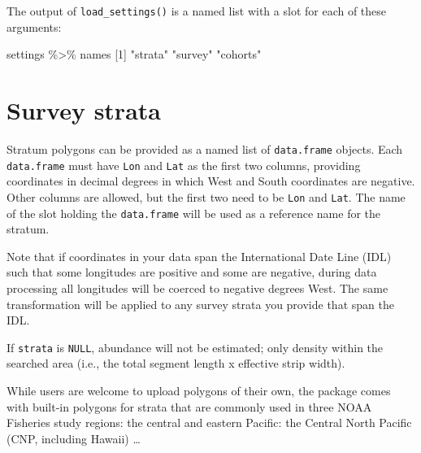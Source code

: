 \documentclass[
]{book}
\newenvironment{Shaded}{\begin{snugshade}}{\end{snugshade}}
\newcommand{\DecValTok}[1]{\textcolor[rgb]{0.00,0.00,0.81}{#1}}
\newcommand{\NormalTok}[1]{#1}
\newcommand{\SpecialCharTok}[1]{\textcolor[rgb]{0.00,0.00,0.00}{#1}}
\newcommand{\StringTok}[1]{\textcolor[rgb]{0.31,0.60,0.02}{#1}}
\begin{document}
The output of \texttt{load\_settings()} is a named list with a slot for each of these arguments:

\begin{Shaded}
\begin{Highlighting}[]
\NormalTok{settings }\SpecialCharTok{\%\textgreater{}\%}\NormalTok{ names}
\NormalTok{[}\DecValTok{1}\NormalTok{] }\StringTok{"strata"}  \StringTok{"survey"}  \StringTok{"cohorts"}
\end{Highlighting}
\end{Shaded}

\hypertarget{survey-strata}{%
\section*{Survey strata}\label{survey-strata}}

Stratum polygons can be provided as a named list of \texttt{data.frame} objects. Each \texttt{data.frame} must have \texttt{Lon} and \texttt{Lat} as the first two columns, providing coordinates in decimal degrees in which West and South coordinates are negative. Other columns are allowed, but the first two need to be \texttt{Lon} and \texttt{Lat}. The name of the slot holding the \texttt{data.frame} will be used as a reference name for the stratum.

Note that if coordinates in your data span the International Date Line (IDL) such that some longitudes are positive and some are negative, during data processing all longitudes will be coerced to negative degrees West. The same transformation will be applied to any survey strata you provide that span the IDL.

If \texttt{strata} is \texttt{NULL}, abundance will not be estimated; only density within the searched area (i.e., the total segment length x effective strip width).

While users are welcome to upload polygons of their own, the package comes with built-in polygons for strata that are commonly used in three NOAA Fisheries study regions: the central and eastern Pacific: the Central North Pacific (CNP, including Hawaii) \ldots{}
\end{document}
